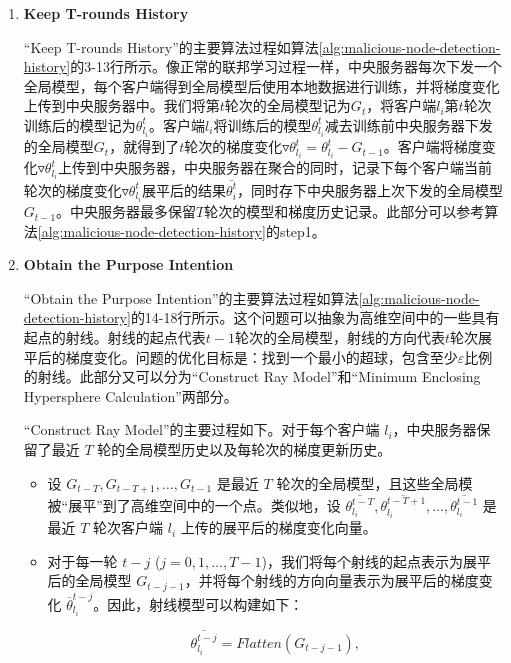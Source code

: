 \documentclass[lettersize,journal]{IEEEtran}
\begin{document}
\begin{enumerate}

\item \textbf{Keep T-rounds History}

“Keep T-rounds History”的主要算法过程如算法\ref{alg:malicious-node-detection-history}的3-13行所示。像正常的联邦学习过程一样，中央服务器每次下发一个全局模型，每个客户端得到全局模型后使用本地数据进行训练，并将梯度变化上传到中央服务器中。我们将第$t$轮次的全局模型记为$G_t$，将客户端$l_i$第$t$轮次训练后的模型记为$\theta^t_{l_i}$。客户端$l_i$将训练后的模型$\theta^t_{l_i}$减去训练前中央服务器下发的全局模型$G_t$，就得到了$t$轮次的梯度变化$\triangledown \theta^t_{l_i}=\theta^t_{l_i}-G_{t-1}$。客户端将梯度变化$\triangledown \theta^t_{l_i}$上传到中央服务器，中央服务器在聚合的同时，记录下每个客户端当前轮次的梯度变化$\triangledown \theta^t_{l_i}$展平后的结果$\bar{\theta_i^t}$，同时存下中央服务器上次下发的全局模型$G_{t-1}$。中央服务器最多保留$T$轮次的模型和梯度历史记录。此部分可以参考算法\ref{alg:malicious-node-detection-history}的step1。

\item \textbf{Obtain the Purpose Intention}

“Obtain the Purpose Intention”的主要算法过程如算法\ref{alg:malicious-node-detection-history}的14-18行所示。这个问题可以抽象为高维空间中的一些具有起点的射线。射线的起点代表$t-1$轮次的全局模型，射线的方向代表$t$轮次展平后的梯度变化。问题的优化目标是：找到一个最小的超球，包含至少$\varepsilon$比例的射线。此部分又可以分为“Construct Ray Model”和“Minimum Enclosing Hypersphere Calculation”两部分。

“Construct Ray Model”的主要过程如下。对于每个客户端 \(l_i\)，中央服务器保留了最近 \(T\) 轮的全局模型历史以及每轮次的梯度更新历史。

\begin{itemize}
    \item 设 \( G_{t-T}, G_{t-T+1}, \dots, G_{t-1} \) 是最近 \(T\) 轮次的全局模型，且这些全局模被“展平”到了高维空间中的一个点。类似地，设 \( \overline{\theta_{l_i}^{t-T}}, \overline{\theta_{l_i}^{t-T+1}}, \dots, \overline{\theta_{l_i}^{t-1}} \) 是最近 \(T\) 轮次客户端 \(l_i\) 上传的展平后的梯度变化向量。
    \item 对于每一轮 \( t-j \) (\( j = 0, 1, \dots, T-1 \))，我们将每个射线的起点表示为展平后的全局模型 \( G_{t-j-1} \)，并将每个射线的方向向量表示为展平后的梯度变化 \( \overline{\theta}_{l_i}^{t-j} \)。因此，射线模型可以构建如下：

    \begin{equation}
    \overline{\theta_{l_i}^{t-j}} = Flatten(G_{t-j-1}),
    \end{equation}


\end{itemize}
\end{enumerate}
\end{document}
